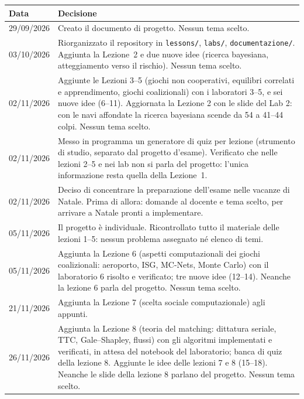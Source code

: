 \documentclass[11pt, a4paper, oneside, openany]{book}
\begin{document}
\begin{center}
\renewcommand{\arraystretch}{1.25}
\begin{tabularx}{\linewidth}{@{}l X@{}}
\toprule
\textbf{Data} & \textbf{Decisione} \\
\midrule
29/09/2026 & Creato il documento di progetto. Nessun tema scelto. \\
03/10/2026 & Riorganizzato il repository in \texttt{lessons/}, \texttt{labs/},
             \texttt{documentazione/}. Aggiunta la Lezione~2 e due nuove idee
             (ricerca bayesiana, atteggiamento verso il rischio). Nessun tema scelto. \\
02/11/2026 & Aggiunte le Lezioni 3--5 (giochi non cooperativi, equilibri correlati e
             apprendimento, giochi coalizionali) con i laboratori 3--5, e sei nuove idee
             (6--11). Aggiornata la Lezione 2 con le slide del Lab 2: con le navi affondate
             la ricerca bayesiana scende da 54 a 41--44 colpi. Nessun tema scelto. \\
02/11/2026 & Messo in programma un generatore di quiz per lezione (strumento di studio,
             separato dal progetto d'esame). Verificato che nelle lezioni 2--5 e nei lab
             non si parla del progetto: l'unica informazione resta quella della Lezione~1. \\
02/11/2026 & Deciso di concentrare la preparazione dell'esame nelle vacanze di Natale. Prima
             di allora: domande al docente e tema scelto, per arrivare a Natale pronti a
             implementare. \\
05/11/2026 & Il progetto è individuale. Ricontrollato tutto il materiale delle lezioni
             1--5: nessun problema assegnato né elenco di temi. \\
05/11/2026 & Aggiunta la Lezione 6 (aspetti computazionali dei giochi coalizionali:
             aeroporto, ISG, MC-Nets, Monte Carlo) con il laboratorio 6 risolto e
             verificato; tre nuove idee (12--14). Neanche la lezione 6 parla del
             progetto. Nessun tema scelto. \\
21/11/2026 & Aggiunta la Lezione 7 (scelta sociale computazionale) agli appunti. \\
26/11/2026 & Aggiunta la Lezione 8 (teoria del matching: dittatura seriale, TTC,
             Gale--Shapley, flussi) con gli algoritmi implementati e verificati, in attesa
             del notebook del laboratorio; banca di quiz della lezione 8. Aggiunte le idee
             delle lezioni 7 e 8 (15--18). Neanche le slide della lezione 8 parlano del
             progetto. Nessun tema scelto. \\
\bottomrule
\end{tabularx}
\end{center}
\end{document}
